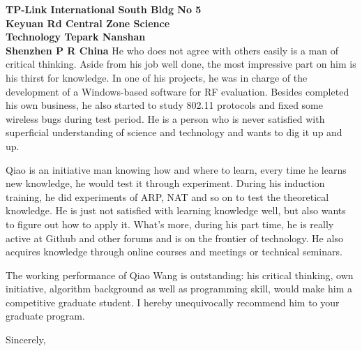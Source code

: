 \documentclass[11pt]{letter} %
\begin{document}
\begin{letter}{\large \bfseries TP-Link International South Bldg No 5 \\ Keyuan Rd Central Zone Science  \\ Technology Tepark Nanshan  \\ Shenzhen P R China}
He who does not agree with others easily is a man of critical thinking. Aside from his job well done, the most impressive part on him is his thirst for knowledge. In one of his projects, he was in charge of the development of a Windows-based software for RF evaluation. Besides completed his own business, he also started to study 802.11 protocols and fixed some wireless bugs during test period. He is a person who is never satisfied with superficial understanding of science and technology and wants to dig it up and up.

Qiao is an initiative man knowing how and where to learn, every time he learns new knowledge, he would test it through experiment. During his induction training, he did experiments of ARP, NAT and so on to test the theoretical knowledge. He is just not satisfied with learning knowledge well, but also wants to figure out how to apply it. What’s more, during his part time, he is really active at Github and other forums and is on the frontier of technology. He also acquires knowledge through online courses and meetings or technical seminars.

The working performance of Qiao Wang is outstanding: his critical thinking, own initiative, algorithm background as well as programming skill, would make him a competitive graduate student. I hereby unequivocally recommend him to your graduate program.

\closing{Sincerely,}


\end{letter}
\end{document}
